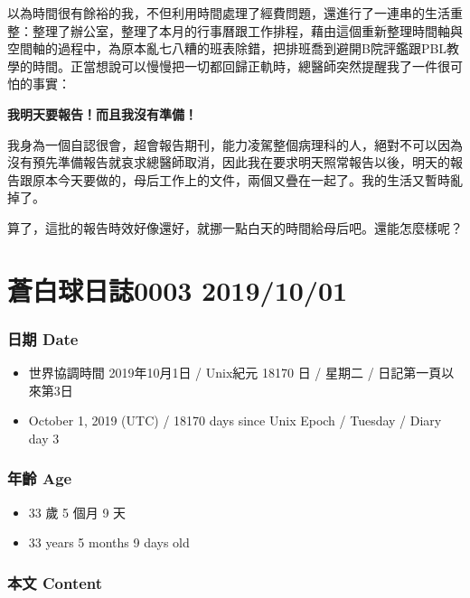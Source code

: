 \documentclass[
]{article}
\providecommand{\tightlist}{%
  \setlength{\itemsep}{0pt}\setlength{\parskip}{0pt}}
\begin{document}
以為時間很有餘裕的我，不但利用時間處理了經費問題，還進行了一連串的生活重整：整理了辦公室，整理了本月的行事曆跟工作排程，藉由這個重新整理時間軸與空間軸的過程中，為原本亂七八糟的班表除錯，把排班喬到避開B院評鑑跟PBL教學的時間。正當想說可以慢慢把一切都回歸正軌時，總醫師突然提醒我了一件很可怕的事實：

\textbf{我明天要報告！而且我沒有準備！}

我身為一個自認很會，超會報告期刊，能力凌駕整個病理科的人，絕對不可以因為沒有預先準備報告就哀求總醫師取消，因此我在要求明天照常報告以後，明天的報告跟原本今天要做的，母后工作上的文件，兩個又疊在一起了。我的生活又暫時亂掉了。

算了，這批的報告時效好像還好，就挪一點白天的時間給母后吧。還能怎麼樣呢？

\hypertarget{ux84bcux767dux7403ux65e5ux8a8c0003-20191001}{%
\section{蒼白球日誌0003
2019/10/01}\label{ux84bcux767dux7403ux65e5ux8a8c0003-20191001}}

\hypertarget{ux65e5ux671f-date-2}{%
\subsubsection{日期 Date}\label{ux65e5ux671f-date-2}}

\begin{itemize}
\tightlist
\item
  世界協調時間 2019年10月1日 / Unix紀元 18170 日 / 星期二 /
  日記第一頁以來第3日
\item
  October 1, 2019 (UTC) / 18170 days since Unix Epoch / Tuesday / Diary
  day 3
\end{itemize}

\hypertarget{ux5e74ux9f61-age-2}{%
\subsubsection{年齡 Age}\label{ux5e74ux9f61-age-2}}

\begin{itemize}
\tightlist
\item
  33 歲 5 個月 9 天
\item
  33 years 5 months 9 days old
\end{itemize}

\hypertarget{ux672cux6587-content-2}{%
\subsubsection{本文 Content}\label{ux672cux6587-content-2}}
\end{document}
